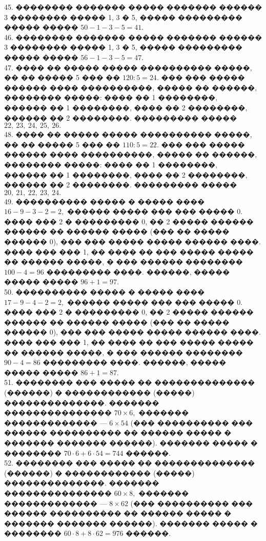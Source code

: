 \documentclass[12pt]{article}
\begin{document}
\begin{center}
\begin{figure}[ht!]
\end{figure}
\end{center}
45. �������� ������� ����� ������� ������ 3 �������� ����� 1, 3 � 5, ����� ��������� ����� ����� $50-1-3-5=41.$\\
46. �������� ������� ����� ������� ������ 3 �������� ����� 1, 3 � 5, ����� ��������� ����� ����� $56-1-3-5=47.$\\
47. ���� �� ����� ����� ���������� �����, �� �� ����� 5 ��� �� $120:5=24.$ ��� ��� ����� ������ ���� ����������, ����� �� ������, �������� �����: ���� �� 1 ��������, ������ �� 1 ��������, ���� �� 2 ��������, ������ �� 2 ��������. ��������� ����� $22,\ 23,\ 24,\ 25,\ 26.$\\
48. ���� �� ����� ����� ���������� �����, �� �� ����� 5 ��� �� $110:5=22.$ ��� ��� ����� ������ ���� ����������, ����� �� ������, �������� �����: ���� �� 1 ��������, ������ �� 1 ��������, ���� �� 2 ��������, ������ �� 2 ��������. ��������� ����� $20,\ 21,\ 22,\ 23,\ 24.$\\
49. ���������� ����� � ����� ���� $16-9-3-2=2,$ ������ ����� ��� ��� ����� 0. ���� ��� 2 � ��������� 0, �� 2 ����� ������ ������ �� ������ ����� (��� �� ����� ������ 0), ��� ��� ����� ����� ������ ����. ���� ��� ��� 1, �� ���� �� ��� ����� ����� �� ������ �����, � ��� ������ �������� $100-4=96$ ��������� ����. ������, ����� ����� ����� $96+1=97.$\\
50. ���������� ����� � ����� ���� $17-9-4-2=2,$ ������ ����� ��� ��� ����� 0. ���� ��� 2 � ��������� 0, �� 2 ����� ������ ������ �� ������ ����� (��� �� ����� ������ 0), ��� ��� ����� ����� ������ ����. ���� ��� ��� 1, �� ���� �� ��� ����� ����� �� ������ �����, � ��� ������ �������� $90-4=86$ ��������� ����. ������, ����� ����� ����� $86+1=87.$\\
51. �������� ��� ����� �� �������������� (������) � ������������ (�����) ��������������. ������� ��������������� $70\times6,$ ������� ������������� --- $6\times54$ (��� ���������� ��� ������ ���������� �� ������ ����� � ������� ������� ������). ������� ����� � �������� $70\cdot6+6\cdot54=744$ ������.\\
52. �������� ��� ����� �� �������������� (������) � ������������ (�����) ��������������. ������� ��������������� $60\times8,$ ������� ������������� --- $8\times62$ (��� ���������� ��� ������ ���������� �� ������ ����� � ������� ������� ������). ������� ����� � �������� $60\cdot8+8\cdot62=976$ ������.\\
\end{document}
